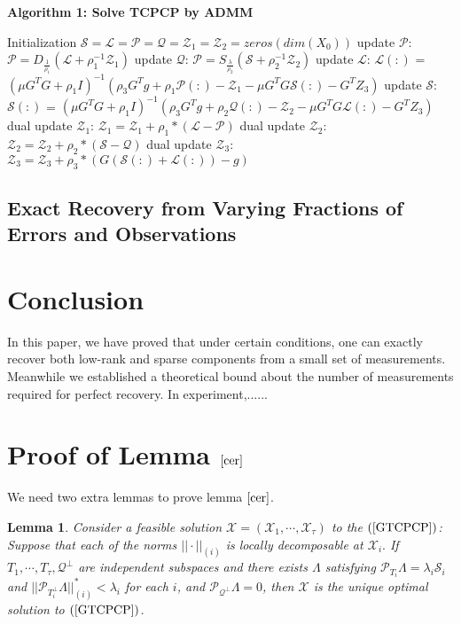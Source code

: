 \documentclass[journal,transmag]{IEEEtran}
\newtheorem{lemma}{Lemma}[section]
\theoremstyle{plain}
\begin{document}
\begin{algorithm}[!htbp]
  \caption*{\textbf{Algorithm 1: Solve TCPCP by ADMM}}
  \begin{algorithmic}[1]
    \State Initialization $\mathcal{S}=\mathcal{L}=\mathcal{P}=\mathcal{Q}=\mathcal{Z}_1=\mathcal{Z}_2=zeros(dim(X_0))$
        \State update $\mathcal{P}$: $\mathcal{P}=D_{\frac{1}{\rho_1}}(\mathcal{L}+\rho_1^{-1}\mathcal{Z}_1)$
        \State update $\mathcal{Q}$: $\mathcal{P}=S_{\frac{\lambda}{\rho_2}}(\mathcal{S}+\rho_2^{-1}\mathcal{Z}_2)$
        \State update $\mathcal{L}$: $\mathcal{L}(:)$ = $(\mu G^TG+\rho_1I)^{-1}
                                                (\rho_3 G^T g+\rho_1\mathcal{P}(:)-\mathcal{Z}_1-\mu G^TG\mathcal{S}(:)-G^TZ_3)$
        \State update $\mathcal{S}$: $\mathcal{S}(:)$ = $(\mu G^TG+\rho_1I)^{-1}
                                                (\rho_3 G^T g+\rho_2\mathcal{Q}(:)-\mathcal{Z}_2-\mu G^TG\mathcal{L}(:)-G^TZ_3)$
        \State dual update $\mathcal{Z}_1$: $\mathcal{Z}_1=\mathcal{Z}_1+\rho_1*(\mathcal{L-P})$
        \State dual update $\mathcal{Z}_2$: $\mathcal{Z}_2=\mathcal{Z}_2+\rho_2*(\mathcal{S-Q})$
        \State dual update $\mathcal{Z}_3$: $\mathcal{Z}_3=\mathcal{Z}_3+\rho_3*(G\mathcal{(S(:)+L(:))}-g)$
    \EndFor
  \end{algorithmic}
\end{algorithm}

\subsection{Exact Recovery from Varying Fractions of Errors and Observations}
\section{Conclusion}
In this paper, we have proved that under certain conditions, one can exactly recover both low-rank and sparse components from a small set of measurements. Meanwhile we established a theoretical bound about the number of measurements required for perfect recovery. In experiment,......
\appendices

\section{Proof of Lemma $\ref{cer}$}
We need two extra lemmas to prove lemma $\ref{cer}$.

\begin{lemma} \label{exact}
 Consider a feasible solution $\mathcal{X}=(\mathcal{X}_1,\cdots, \mathcal{X}_{\tau})$ to the $(\ref{GTCPCP})$:
Suppose that each of the norms $||\cdot||_{(i)}$ is locally decomposable at $\mathcal{X}_i.$ If $T_1,\cdots,T_{\tau},\mathcal{Q}^{\bot}$ are independent subspaces and there exists $\Lambda$ satisfying $\mathcal{P}_{T_i}\Lambda=\lambda_i \mathcal{S}_i$ and $||\mathcal{P}_{T_i^{\bot}}\Lambda||_{(i)}^* < \lambda_i$ for each $i$, and $\mathcal{P}_{\mathcal{Q}^{\bot}} \Lambda=0$, then $\mathcal{X}$ is the unique optimal solution to $(\ref{GTCPCP})$.
\end{lemma}
\end{document}
